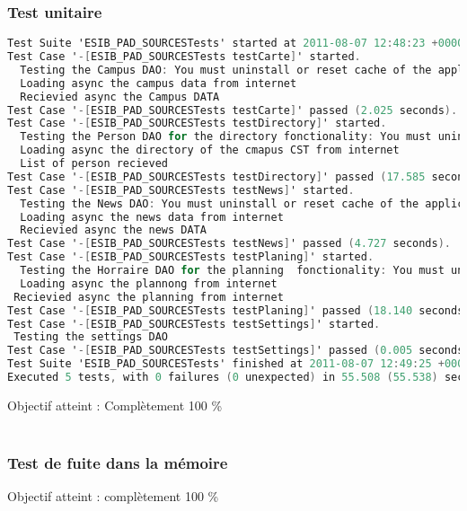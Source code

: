 		 		 \subsubsection*{Test unitaire}
		 		 \begin{lstlisting}[language=C,caption = Log des test unitaires]
Test Suite 'ESIB_PAD_SOURCESTests' started at 2011-08-07 12:48:23 +0000
Test Case '-[ESIB_PAD_SOURCESTests testCarte]' started.
  Testing the Campus DAO: You must uninstall or reset cache of the application before testing
  Loading async the campus data from internet
  Recievied async the Campus DATA
Test Case '-[ESIB_PAD_SOURCESTests testCarte]' passed (2.025 seconds).
Test Case '-[ESIB_PAD_SOURCESTests testDirectory]' started.
  Testing the Person DAO for the directory fonctionality: You must uninstall or reset cache of the application before testing
  Loading async the directory of the cmapus CST from internet
  List of person recieved
Test Case '-[ESIB_PAD_SOURCESTests testDirectory]' passed (17.585 seconds).
Test Case '-[ESIB_PAD_SOURCESTests testNews]' started.
  Testing the News DAO: You must uninstall or reset cache of the application before testing
  Loading async the news data from internet
  Recievied async the news DATA
Test Case '-[ESIB_PAD_SOURCESTests testNews]' passed (4.727 seconds).
Test Case '-[ESIB_PAD_SOURCESTests testPlaning]' started.
  Testing the Horraire DAO for the planning  fonctionality: You must uninstall or reset cache of the application before testing
  Loading async the plannong from internet
 Recievied async the planning from internet
Test Case '-[ESIB_PAD_SOURCESTests testPlaning]' passed (18.140 seconds).
Test Case '-[ESIB_PAD_SOURCESTests testSettings]' started.
 Testing the settings DAO
Test Case '-[ESIB_PAD_SOURCESTests testSettings]' passed (0.005 seconds).
Test Suite 'ESIB_PAD_SOURCESTests' finished at 2011-08-07 12:49:25 +0000.
Executed 5 tests, with 0 failures (0 unexpected) in 55.508 (55.538) seconds
		 		 \end{lstlisting}
		 		Objectif atteint : {\color{green}Complètement 100 \% \CheckedBox}\\
		 		\\

		 		 \subsubsection*{Test de fuite dans la mémoire}
		 		 Objectif atteint : {\color{green}complètement 100 \% \CheckedBox}\\